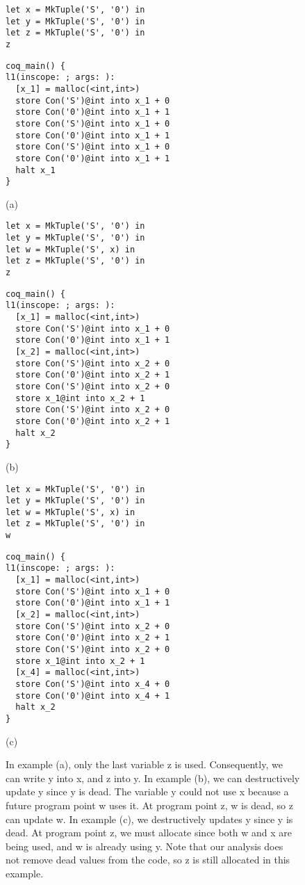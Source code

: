 \documentclass{article}
\begin{document}
\begin{figure}
\centering
\begin{minipage}[t]{.31\textwidth}
\begin{lstlisting}
let x = MkTuple('S', '0') in
let y = MkTuple('S', '0') in
let z = MkTuple('S', '0') in
z
\end{lstlisting}
\begin{lstlisting}
coq_main() {
l1(inscope: ; args: ):
  [x_1] = malloc(<int,int>)
  store Con('S')@int into x_1 + 0
  store Con('0')@int into x_1 + 1
  store Con('S')@int into x_1 + 0
  store Con('0')@int into x_1 + 1
  store Con('S')@int into x_1 + 0
  store Con('0')@int into x_1 + 1
  halt x_1
}
\end{lstlisting}
\centering (a)
\end{minipage}
\hspace{5pt}
\begin{minipage}[t]{.31\textwidth}
\begin{lstlisting}
let x = MkTuple('S', '0') in
let y = MkTuple('S', '0') in
let w = MkTuple('S', x) in
let z = MkTuple('S', '0') in
z
\end{lstlisting}
\begin{lstlisting}
coq_main() {
l1(inscope: ; args: ):
  [x_1] = malloc(<int,int>)
  store Con('S')@int into x_1 + 0
  store Con('0')@int into x_1 + 1
  [x_2] = malloc(<int,int>)
  store Con('S')@int into x_2 + 0
  store Con('0')@int into x_2 + 1
  store Con('S')@int into x_2 + 0
  store x_1@int into x_2 + 1
  store Con('S')@int into x_2 + 0
  store Con('0')@int into x_2 + 1
  halt x_2
}
\end{lstlisting}
\centering (b)
\end{minipage}
\hspace{5pt}
\begin{minipage}[t]{.31\textwidth}
\begin{lstlisting}
let x = MkTuple('S', '0') in
let y = MkTuple('S', '0') in
let w = MkTuple('S', x) in
let z = MkTuple('S', '0') in
w
\end{lstlisting}
\begin{lstlisting}
coq_main() {
l1(inscope: ; args: ):
  [x_1] = malloc(<int,int>)
  store Con('S')@int into x_1 + 0
  store Con('0')@int into x_1 + 1
  [x_2] = malloc(<int,int>)
  store Con('S')@int into x_2 + 0
  store Con('0')@int into x_2 + 1
  store Con('S')@int into x_2 + 0
  store x_1@int into x_2 + 1
  [x_4] = malloc(<int,int>)
  store Con('S')@int into x_4 + 0
  store Con('0')@int into x_4 + 1
  halt x_2
}
\end{lstlisting}
\centering (c)
\end{minipage}
\caption{In example (a), only the last variable z is used. Consequently, we can write y into x, and z into y. In example (b), we can destructively update y since y is dead. The variable y could not use x because a future program point w uses it. At program point z, w is dead, so z can update w. In example (c), we destructively updates y since y is dead. At program point z, we must allocate since both w and x are being used, and w is already using y. Note that our analysis does not remove dead values from the code, so z is still allocated in this example. }
\label{fig:dupdate}
\end{figure}
\end{document}
